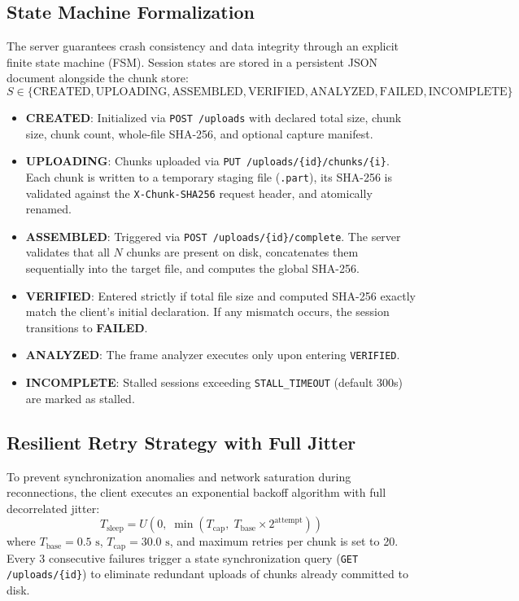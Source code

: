 \documentclass[11pt,a4paper]{article}
\begin{document}
\subsection{State Machine Formalization}
The server guarantees crash consistency and data integrity through an explicit finite state machine (FSM). Session states are stored in a persistent JSON document alongside the chunk store:
\[
S \in \{\text{CREATED}, \text{UPLOADING}, \text{ASSEMBLED}, \text{VERIFIED}, \text{ANALYZED}, \text{FAILED}, \text{INCOMPLETE}\}
\]

\begin{itemize}[leftmargin=*,itemsep=1pt]
    \item \textbf{CREATED}: Initialized via \texttt{POST /uploads} with declared total size, chunk size, chunk count, whole-file SHA-256, and optional capture manifest.
    \item \textbf{UPLOADING}: Chunks uploaded via \texttt{PUT /uploads/\{id\}/chunks/\{i\}}. Each chunk is written to a temporary staging file (\texttt{.part}), its SHA-256 is validated against the \texttt{X-Chunk-SHA256} request header, and atomically renamed.
    \item \textbf{ASSEMBLED}: Triggered via \texttt{POST /uploads/\{id\}/complete}. The server validates that all $N$ chunks are present on disk, concatenates them sequentially into the target file, and computes the global SHA-256.
    \item \textbf{VERIFIED}: Entered strictly if total file size and computed SHA-256 exactly match the client's initial declaration. If any mismatch occurs, the session transitions to \textbf{FAILED}.
    \item \textbf{ANALYZED}: The frame analyzer executes only upon entering \texttt{VERIFIED}.
    \item \textbf{INCOMPLETE}: Stalled sessions exceeding \texttt{STALL\_TIMEOUT} (default 300s) are marked as stalled.
\end{itemize}

\subsection{Resilient Retry Strategy with Full Jitter}
To prevent synchronization anomalies and network saturation during reconnections, the client executes an exponential backoff algorithm with full decorrelated jitter:
\begin{equation}
T_{\text{sleep}} = U\left(0, \; \min\left(T_{\text{cap}}, \; T_{\text{base}} \times 2^{\text{attempt}}\right)\right)
\end{equation}
where $T_{\text{base}} = 0.5\text{ s}$, $T_{\text{cap}} = 30.0\text{ s}$, and maximum retries per chunk is set to 20. Every 3 consecutive failures trigger a state synchronization query (\texttt{GET /uploads/\{id\}}) to eliminate redundant uploads of chunks already committed to disk.
\end{document}
